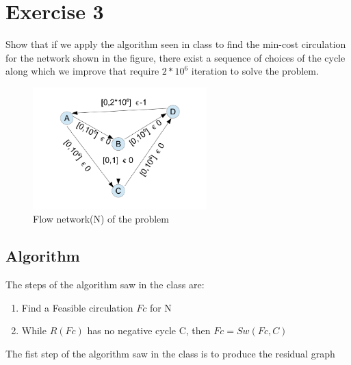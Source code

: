 \documentclass[]{article}
\begin{document}
\subsection{}


\section{Exercise 3}

Show that if we apply the algorithm seen in class to find the min-cost circulation for the network shown
in the figure, there exist a sequence of choices of the cycle along which we improve that require $2*10^6$
iteration to solve the problem.



\begin{figure}[H]
	\begin{center}
		\includegraphics[width=0.6\textwidth]{abcd.png}
		\caption{Flow network(N) of the problem }

	\end{center}
\end{figure}


\subsection{Algorithm}

The steps of the algorithm saw in the class are:
\begin{enumerate}

\item Find a Feasible circulation $Fc$ for N
\item While $R(Fc)$ has no negative cycle C, then $Fc = Sw(Fc,C)$

\end{enumerate}



The fist step of the algorithm saw in the class is to produce the residual graph
\end{document}
